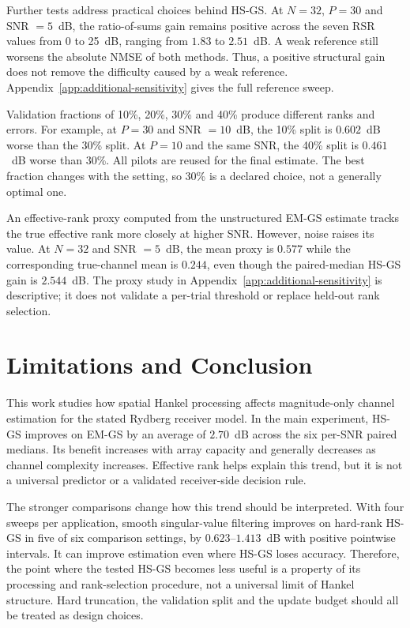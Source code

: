 \documentclass[journal]{IEEEtran}
\begin{document}
Further tests address practical choices behind HS-GS. At $N=32$, $P=30$
and SNR $=5$~dB, the ratio-of-sums gain remains positive across the seven
RSR values from 0 to 25~dB, ranging from $1.83$ to $2.51$~dB. A weak
reference still worsens the absolute NMSE of both methods. Thus, a positive
structural gain does not remove the difficulty caused by a weak reference.
Appendix~\ref{app:additional-sensitivity} gives the full reference sweep.

Validation fractions of 10\%, 20\%, 30\% and 40\% produce different ranks
and errors. For example, at $P=30$ and SNR $=10$~dB, the 10\% split is
$0.602$~dB worse than the 30\% split. At $P=10$ and the same SNR, the
40\% split is $0.461$~dB worse than 30\%. All pilots are reused for the
final estimate. The best fraction changes with the setting, so 30\% is a
declared choice, not a generally optimal one.

An effective-rank proxy computed from the unstructured EM-GS estimate
tracks the true effective rank more closely at higher SNR. However, noise
raises its value. At $N=32$ and SNR $=5$~dB, the mean proxy is $0.577$
while the corresponding true-channel mean is $0.244$, even though the
paired-median HS-GS gain is $2.544$~dB. The proxy study in
Appendix~\ref{app:additional-sensitivity} is descriptive; it does not
validate a per-trial threshold or replace held-out rank selection.

\section{Limitations and Conclusion}

This work studies how spatial Hankel processing affects magnitude-only
channel estimation for the stated Rydberg receiver model. In the main
experiment, HS-GS improves on EM-GS by an average of $2.70$~dB across the
six per-SNR paired medians. Its benefit increases with array capacity and
generally decreases as channel complexity increases. Effective rank helps
explain this trend, but it is not a universal predictor or a validated
receiver-side decision rule.

The stronger comparisons change how this trend should be interpreted.
With four sweeps per application, smooth singular-value filtering improves
on hard-rank HS-GS in five of six comparison settings, by $0.623$--$1.413$~dB with positive
pointwise intervals. It can improve estimation even where HS-GS loses
accuracy. Therefore, the point where the tested HS-GS becomes less useful
is a property of its processing and rank-selection procedure, not a
universal limit of Hankel structure. Hard truncation, the validation split
and the update budget should all be treated as design choices.
\end{document}
